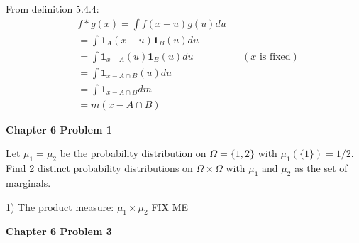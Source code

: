 \documentclass[12pt,letterpaper, onecolumn]{exam}
\newcommand{\one}{\mathbf{1}}
\begin{document}
\begin{questions}
\begin{solution}
        From definition 5.4.4: 
        \begin{align*}
            & f*g(x) = \int f(x - u) g(u) du \\
            & = \int \one_A(x - u) \one_B(u) du \\
            & = \int \one_{x - A}(u) \one_{B}(u) du && (x\textrm{ is fixed}) \\
            & = \int \one_{x - A \cap B}(u)du \\
            & = \int \one_{x - A \cap B} dm \\
            & = m(x - A \cap B)
        \end{align*}
    \end{solution}
\clearpage
    \question \textbf{Chapter 6 Problem 1}

    Let $\mu_1 = \mu_2$ be the probability distribution on $\Omega = \{1, 2\}$ with $\mu_1(\{1\}) = 1/2$. Find 2 distinct probability distributions on $\Omega \times \Omega$ with $\mu_1$ and $\mu_2$ as the set of marginals. 
    \begin{solution}
    1) The product measure: $\mu_1 \times \mu_2$        FIX ME
    \end{solution}
\clearpage
    \question \textbf{Chapter 6 Problem 3}


\end{questions}
\end{document}
